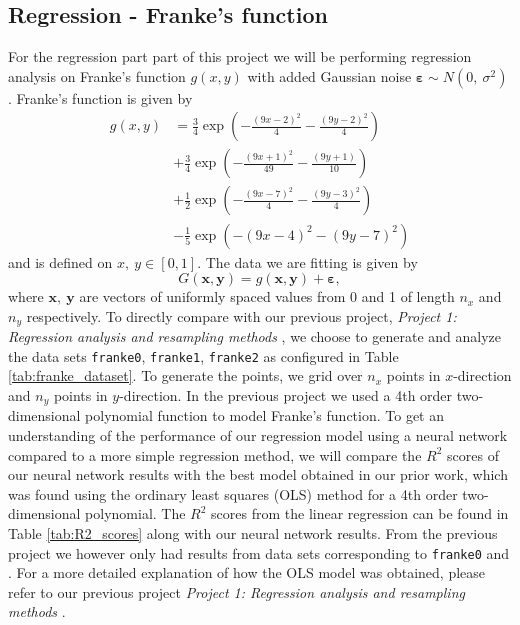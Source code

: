 \documentclass[a4paper, 11pt, twocolumn]{article}
\begin{document}
\subsection{Regression - Franke's function}
For the regression part part of this project we will be performing regression
analysis on Franke's function $g(x,y)$ with added Gaussian noise $\bm{\varepsilon}
\sim N(0,\  \sigma^2) $. Franke's function is given by
\begin{align}
g(x,y) &= \frac{3}{4}\exp{\left(-\frac{(9x-2)^2}{4}   - \frac{(9y-2)^2}{4}\right)} \nonumber\\
 &+\frac{3}{4}\exp{\left(-\frac{(9x+1)^2}{49}- \frac{(9y+1)}{10}\right)} \nonumber\\
 &+\frac{1}{2}\exp{\left(-\frac{(9x-7)^2}{4} - \frac{(9y-3)^2}{4}\right)} \nonumber\\
 &-\frac{1}{5}\exp{\left(-(9x-4)^2 - (9y-7)^2\right) }  \label{eq:Franke}
\end{align} and is defined on $x,\ y \in [0,1]$. The data we are fitting is
given by
$$G(\bm{x}, \bm{y}) = g(\bm{x}, \bm{y}) + \bm{\varepsilon},$$
where $\bm{x},\ \bm{y}$ are vectors of uniformly spaced values from 0 and 1 of
length $n_x$ and $n_y$ respectively. To directly compare with our previous
project, \textit{Project 1: Regression analysis and resampling methods}
\cite{regpaper}, we choose to generate and analyze the data sets \texttt{franke0},
\texttt{franke1}, \texttt{franke2} as configured in Table \ref{tab:franke_dataset}.
To generate the points, we grid over $n_x$ points in $x$-direction and $n_y$ points
in $y$-direction.
In the previous project we used a 4th order two-dimensional polynomial function
to model Franke's function. To get an understanding of the performance of our
regression model using a neural network compared to a more simple regression
method, we will compare the $R^2$ scores of our neural network results with the
best model obtained in our prior work, which was found using the ordinary least
squares (OLS) method for a 4th order two-dimensional polynomial. The $R^2$ scores
from the linear regression can be found in Table \ref{tab:R2_scores} along with
our neural network results. From the previous project we however only had
results from data sets corresponding to \texttt{franke0} and .
For a more detailed explanation of how the OLS model was obtained, please refer
to our previous project \textit{Project 1: Regression analysis and resampling
methods }\cite{regpaper}.
\end{document}

